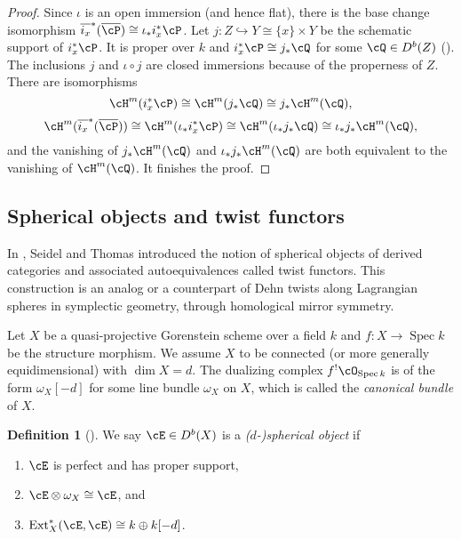 \documentclass[12pt]{amsart}
\numberwithin{equation}{section}
\theoremstyle{plain}
\theoremstyle{definition}
\newtheorem{definition}[theorem]{Definition}
\DeclareMathOperator{\Spec}{\mathrm{Spec}}
\DeclareMathOperator{\Ext}{\mathrm{Ext}}
\begin{document}
\begin{proof}
    Since $\iota$ is an open immersion (and hence flat), there is the base change isomorphism $\overline{i_x}^*(\overline{\cP}) \cong \iota_*i_x^* \cP$.
    Let $j \colon Z \hookrightarrow Y \cong \{x\} \times Y$ be the schematic support of $i_x^* \cP$.
    It is proper over $k$ and $i_x^* \cP \cong j_* \cQ$ for some $\cQ \in D^b(Z)$ (\cite[\href{https://stacks.math.columbia.edu/tag/0CYK}{Tag 0CYK}]{stacks-project}).
    The inclusions $j$ and $\iota \circ j$ are closed immersions because of the properness of $Z$.
    There are isomorphisms
    \begin{equation}
        \cH^m(i_x^* \cP) \cong \cH^m(j_* \cQ) \cong j_*\cH^m(\cQ),
    \end{equation}
    \begin{equation}
        \cH^m(\overline{i_x}^*(\overline{\cP})) \cong \cH^m(\iota_*i_x^* \cP) \cong \cH^m(\iota_*j_* \cQ) \cong \iota_*j_*\cH^m(\cQ),
    \end{equation}
    and the vanishing of $j_*\cH^m(\cQ)$ and $\iota_*j_*\cH^m(\cQ)$ are both equivalent to the vanishing of $\cH^m(\cQ)$.
    It finishes the proof.
\end{proof}


\subsection{Spherical objects and twist functors}
In \cite{MR1831820}, Seidel and Thomas introduced the notion of spherical objects of derived categories and associated autoequivalences called twist functors.
This construction is an analog or a counterpart of Dehn twists along Lagrangian spheres in symplectic geometry, through homological mirror symmetry.

Let $X$ be a quasi-projective Gorenstein scheme over a field $k$ and $f \colon X \to \Spec k$ be the structure morphism.
We assume $X$ to be connected (or more generally equidimensional) with $\dim X = d$.
The dualizing complex $f^!\cO_{\Spec k}$ is of the form $\omega_X[-d]$ for some line bundle $\omega_X$ on $X$, which is called the \emph{canonical bundle} of $X$.
\begin{definition}[{\cite{MR1831820}}]
    We say $\cE \in D^b(X)$ is a \emph{($d$-)spherical object} if
    \begin{enumerate}
        \item $\cE$ is perfect and has proper support,
        \item $\cE \otimes \omega_X \cong \cE$, and
        \item $\Ext^*_X(\cE, \cE) \cong k \oplus k[-d]$.
    \end{enumerate}
\end{definition}
\end{document}
